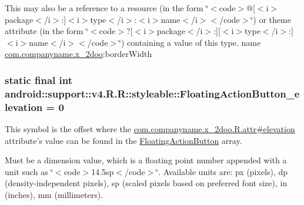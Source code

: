 This may also be a reference to a resource (in the form \char`\"{}$<$code$>$@\mbox{[}$<$i$>$package$<$/i$>$:\mbox{]}$<$i$>$type$<$/i$>$:$<$i$>$name$<$/i$>$$<$/code$>$\char`\"{}) or theme attribute (in the form \char`\"{}$<$code$>$?\mbox{[}$<$i$>$package$<$/i$>$:\mbox{]}\mbox{[}$<$i$>$type$<$/i$>$:\mbox{]}$<$i$>$name$<$/i$>$$<$/code$>$\char`\"{}) containing a value of this type.  name \hyperlink{namespacecom_1_1companyname_1_1x__2doo}{com.companyname.x\_\-2doo}:borderWidth \hypertarget{classandroid_1_1support_1_1v4_1_1_r_1_1styleable_21d6aad3ec0a6bd9aa987ca685e4c166}{
\subsubsection[{FloatingActionButton\_\-elevation}]{\setlength{\rightskip}{0pt plus 5cm}static final int android::support::v4.R.R::styleable::FloatingActionButton\_\-elevation = 0}}
\label{classandroid_1_1support_1_1v4_1_1_r_1_1styleable_21d6aad3ec0a6bd9aa987ca685e4c166}


This symbol is the offset where the \hyperlink{classcom_1_1companyname_1_1x__2doo_1_1_r_1_1attr_3661b6445a2b19a2dca2157df91648d2}{com.companyname.x\_\-2doo.R.attr\#elevation} attribute's value can be found in the \hyperlink{classandroid_1_1support_1_1v4_1_1_r_1_1styleable_51a0276d7190a1195d58170b1623ab3c}{FloatingActionButton} array.

Must be a dimension value, which is a floating point number appended with a unit such as \char`\"{}$<$code$>$14.5sp$<$/code$>$\char`\"{}. Available units are: px (pixels), dp (density-independent pixels), sp (scaled pixels based on preferred font size), in (inches), mm (millimeters). 

